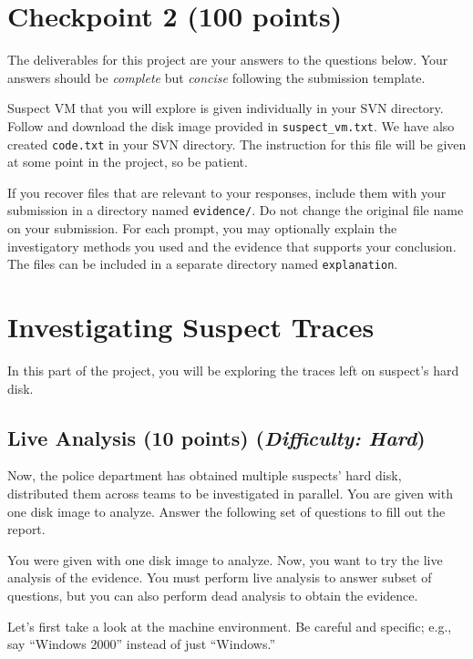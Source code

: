 \documentclass[letterpaper,12pt]{report}
\begin{document}
\newpage

\section{Checkpoint 2 (100 points)}
\label{sec:checkpoint_2}
The deliverables for this project are your answers to the questions below. Your answers should be \emph{complete} but \emph{concise} following the submission template.

\medskip
Suspect VM that you will explore is given individually in your SVN directory. Follow and download the disk image provided in \texttt{suspect\_vm.txt}. We have also created \texttt{code.txt} in your SVN directory. The instruction for this file will be given at some point in the project, so be patient.

\medskip
If you recover files that are relevant to your responses, include them with your submission in a directory named \texttt{evidence/}. Do not change the original file name on your submission.
For each prompt, you may optionally explain the investigatory methods you used and the evidence that supports your conclusion.  The files can be included in a separate directory named \texttt{explanation}.

\section*{Investigating Suspect Traces}
In this part of the project, you will be exploring the traces left on suspect's hard disk.

\subsection{Live Analysis (10 points)    \hfill\rm\normalsize (\emph{Difficulty: Hard})}
\label{sec:live_analysis}
Now, the police department has obtained multiple suspects' hard disk, distributed them across teams to be investigated in parallel. You are given with one disk image to analyze. Answer the following set of questions to fill out the report.

\medskip
You were given with one disk image to analyze. Now, you want to try the live analysis of the evidence. You must perform live analysis to answer subset of questions, but you can also perform dead analysis to obtain the evidence.

\medskip
Let's first take a look at the machine environment. Be careful and specific; e.g., say ``Windows 2000'' instead of just ``Windows.''
\end{document}
